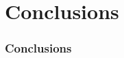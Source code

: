 \section{Conclusions}
 

\begin{frame}
 \frametitle{Conclusions}
 \framesubtitle{}
 \label{ch5:concl}

\end{frame}
\note{}




